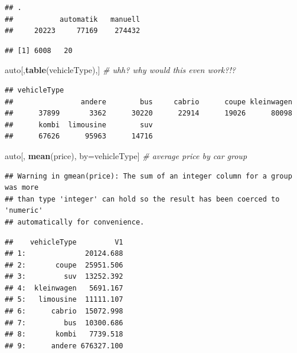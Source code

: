 \documentclass[]{book}
\newenvironment{Shaded}{\begin{snugshade}}{\end{snugshade}}
\newcommand{\KeywordTok}[1]{\textcolor[rgb]{0.13,0.29,0.53}{\textbf{#1}}}
\newcommand{\StringTok}[1]{\textcolor[rgb]{0.31,0.60,0.02}{#1}}
\newcommand{\CommentTok}[1]{\textcolor[rgb]{0.56,0.35,0.01}{\textit{#1}}}
\newcommand{\OperatorTok}[1]{\textcolor[rgb]{0.81,0.36,0.00}{\textbf{#1}}}
\newcommand{\NormalTok}[1]{#1}
\theoremstyle{definition}
\theoremstyle{definition}
\theoremstyle{definition}
\theoremstyle{remark}
\begin{document}
\begin{verbatim}
## .
##           automatik   manuell 
##     20223     77169    274432
\end{verbatim}

\begin{Shaded}
\end{Shaded}

\begin{verbatim}
## [1] 6008   20
\end{verbatim}

\begin{Shaded}
\begin{Highlighting}[]
\NormalTok{auto[,}\KeywordTok{table}\NormalTok{(vehicleType),] }\CommentTok{# uhh? why would this even work?!?}
\end{Highlighting}
\end{Shaded}

\begin{verbatim}
## vehicleType
##                andere        bus     cabrio      coupe kleinwagen 
##      37899       3362      30220      22914      19026      80098 
##      kombi  limousine        suv 
##      67626      95963      14716
\end{verbatim}

\begin{Shaded}
\begin{Highlighting}[]
\NormalTok{auto[, }\KeywordTok{mean}\NormalTok{(price), by=vehicleType] }\CommentTok{# average price by car group}
\end{Highlighting}
\end{Shaded}

\begin{verbatim}
## Warning in gmean(price): The sum of an integer column for a group was more
## than type 'integer' can hold so the result has been coerced to 'numeric'
## automatically for convenience.
\end{verbatim}

\begin{verbatim}
##    vehicleType         V1
## 1:              20124.688
## 2:       coupe  25951.506
## 3:         suv  13252.392
## 4:  kleinwagen   5691.167
## 5:   limousine  11111.107
## 6:      cabrio  15072.998
## 7:         bus  10300.686
## 8:       kombi   7739.518
## 9:      andere 676327.100
\end{verbatim}
\end{document}
